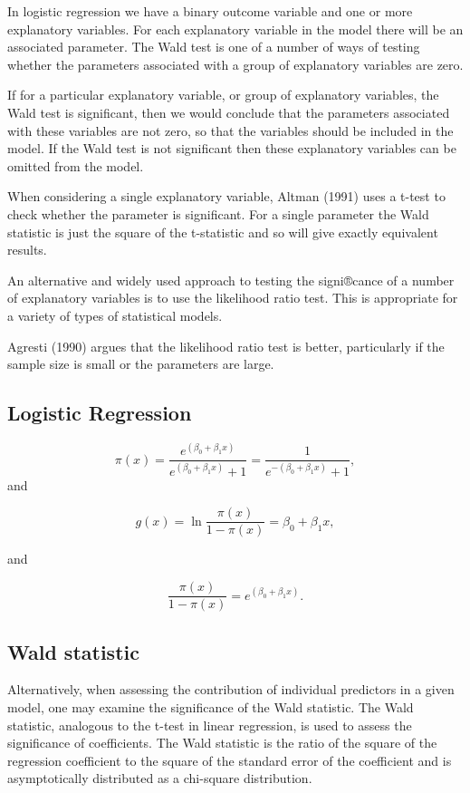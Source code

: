 \documentclass[a4paper,12pt]{article}
\begin{document}
In logistic regression we have a binary outcome variable and one or more explanatory variables. For each explanatory variable in the model there will be an associated parameter. The Wald test is one of a number of ways of testing whether the parameters associated with a group of explanatory variables are zero.

If for a particular explanatory variable, or group of explanatory variables, the Wald test is significant, then we would conclude that the parameters associated with these variables are not zero, so that the variables should be included in the model. If the Wald test is not significant then these explanatory variables can be omitted from the model. 

When considering a single explanatory variable, Altman (1991) uses a t-test to check whether the parameter is significant. For a single parameter the Wald statistic is just the square of the t-statistic and so will give exactly equivalent results.

An alternative and widely used approach to testing the signi®cance of a number of explanatory variables is to use the likelihood ratio test. This is appropriate for a variety of types of statistical models. 

Agresti (1990) argues that the likelihood ratio test is better, particularly if the sample size is small or the parameters are large.

\subsection{Logistic Regression}

\[ \pi(x) = \frac{e^{(\beta_0 + \beta_1 x)}} {e^{(\beta_0 + \beta_1 x)} + 1} = \frac {1} {e^{-(\beta_0 + \beta_1 x)} + 1},\]
and

\[g(x) = \ln \frac {\pi(x)} {1 - \pi(x)} = \beta_0 + \beta_1 x ,\]

and

\[\frac{\pi(x)} {1 - \pi(x)} = e^{(\beta_0 + \beta_1 x)}.\]

\subsection{Wald statistic}

Alternatively, when assessing the contribution of individual predictors in a given model, one may examine the significance of the Wald statistic. The Wald statistic, analogous to the t-test in linear regression, is used to assess the significance of coefficients. The Wald statistic is the ratio of the square of the regression coefficient to the square of the standard error of the coefficient and is asymptotically distributed as a chi-square distribution.
\end{document}

